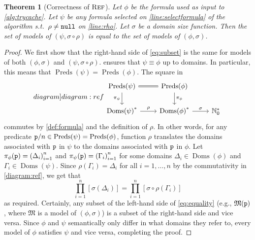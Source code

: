 \documentclass{article}
\newtheorem{theorem}{Theorem}
\newcommand{\predicate}{\texttt{\textup{p}}}
\newcommand{\nulll}{\texttt{\textup{null}}}
\DeclareMathOperator{\Reff}{\textsc{Ref}}
\DeclareMathOperator{\Doms}{Doms}
\DeclareMathOperator{\Preds}{Preds}
\begin{document}
\begin{theorem}[Correctness of $\Reff$]
  Let $\phi$ be the formula used as input to \cref{alg:trycache}. Let $\psi$ be
  any formula selected on \cref{line:selectformula} of the algorithm s.t.\
  $\rho \ne \nulll$ on \cref{line:rho}. Let $\sigma$ be a domain size function.
  Then the set of models of $(\psi, \sigma \circ \rho)$ is equal to the set of
  models of $(\phi, \sigma)$.
\end{theorem}
\begin{proof}
  We first show that the right-hand side of \cref{eq:subset} is the same for
  models of both $(\phi, \sigma)$ and $(\psi, \sigma \circ \rho)$.
  \Cref{alg:trycache} ensures that $\psi \equiv \phi$ up to domains. In
  particular, this means that $\Preds(\psi) = \Preds(\phi)$. The square in
  \begin{equation}\label[diagram]{diagram:ref}
    \begin{tikzcd}
      \Preds(\psi) \ar[equal]{r} \ar[d, swap, "\pi_{\psi}"] & \Preds(\phi) \ar[d, "\pi_{\phi}"] \\
      {\Doms(\psi)}^{\ast} \ar[r, "\rho"] & {\Doms(\phi)}^{\ast} \ar[r, "\sigma"] & \mathbb{N}_{0}^{\ast}
    \end{tikzcd}
  \end{equation}
  commutes by \cref{def:formula} and the definition of $\rho$. In other words,
  for any predicate $\predicate/n \in \Preds(\psi) = \Preds(\phi)$, function
  $\rho$ translates the domains associated with $\predicate$ in $\psi$ to the
  domains associated with $\predicate$ in $\phi$. Let
  $\pi_{\phi}(\predicate) = {(\Delta_{i})}_{i=1}^{n}$ and
  $\pi_{\psi}(\predicate) = {(\Gamma_{i})}_{i=1}^{n}$ for some domains
  $\Delta_{i} \in \Doms(\phi)$ and $\Gamma_{i} \in \Doms(\psi)$. Since
  $\rho(\Gamma_{i}) = \Delta_{i}$ for all $i = 1, \dots, n$ by the commutativity
  in \cref{diagram:ref}, we get that
  \begin{equation}\label{eq:equality}
    \prod_{i=1}^{n}[\sigma(\Delta_{i})] = \prod_{i=1}^{n}[\sigma \circ \rho(\Gamma_{i})]
  \end{equation}
  as required. Certainly, any subset of the left-hand side of \cref{eq:equality}
  (e.g., $\mathfrak{M}(\predicate)$, where $\mathfrak{M}$ is a model of
  $(\phi, \sigma)$) is a subset of the right-hand side and vice versa. Since
  $\phi$ and $\psi$ semantically only differ in what domains they refer to,
  every model of $\phi$ satisfies $\psi$ and vice versa, completing the proof.
\end{proof}
\end{document}
